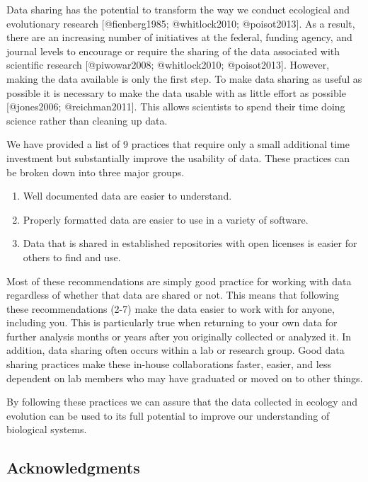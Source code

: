 Data sharing has the potential to transform the way we conduct
ecological and evolutionary research {[}@fienberg1985; @whitlock2010;
@poisot2013{]}. As a result, there are an increasing number of
initiatives at the federal, funding agency, and journal levels to
encourage or require the sharing of the data associated with scientific
research {[}@piwowar2008; @whitlock2010; @poisot2013{]}. However, making
the data available is only the first step. To make data sharing as
useful as possible it is necessary to make the data usable with as
little effort as possible {[}@jones2006; @reichman2011{]}. This allows
scientists to spend their time doing science rather than cleaning up
data.

We have provided a list of 9 practices that require only a small
additional time investment but substantially improve the usability of
data. These practices can be broken down into three major groups.

\begin{enumerate}
\def\labelenumi{\arabic{enumi}.}
\itemsep1pt\parskip0pt
\item
  Well documented data are easier to understand.
\item
  Properly formatted data are easier to use in a variety of software.
\item
  Data that is shared in established repositories with open licenses is
  easier for others to find and use.
\end{enumerate}

Most of these recommendations are simply good practice for working with
data regardless of whether that data are shared or not. This means that
following these recommendations (2-7) make the data easier to work with
for anyone, including you. This is particularly true when returning to
your own data for further analysis months or years after you originally
collected or analyzed it. In addition, data sharing often occurs within
a lab or research group. Good data sharing practices make these in-house
collaborations faster, easier, and less dependent on lab members who may
have graduated or moved on to other things.

By following these practices we can assure that the data collected in
ecology and evolution can be used to its full potential to improve our
understanding of biological systems.

\subsection{Acknowledgments}\label{acknowledgments}

